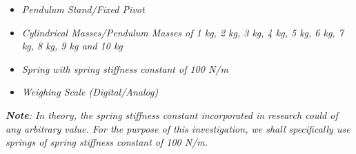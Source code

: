 \begin{itemize}
    \item \textit{Pendulum Stand/Fixed Pivot}
    \item \textit{Cylindrical Masses/Pendulum Masses of 1 kg, 2 kg, 3 kg, 4 kg, 5 kg, 6 kg, 7 kg, 8 kg, 9 kg and 10 kg}
    \item \textit{Spring with spring stiffness constant of 100 N/m}
    \item \textit{Weighing Scale (Digital/Analog)}
    \label{mat}
\end{itemize}

\textit{\textbf{Note}: In theory, the spring stiffness constant incorporated in research could of any arbitrary value. For the purpose of this investigation, we shall specifically use springs of spring stiffness constant of 100 N/m.}


